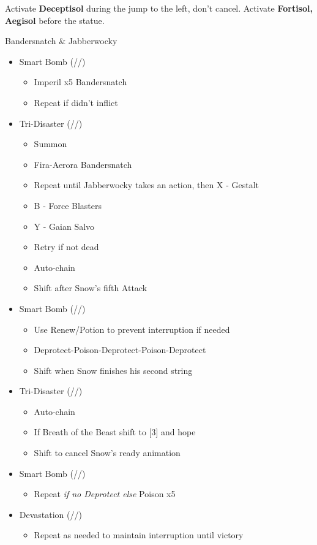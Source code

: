\begin{multicols}{2}
Activate \textbf{Deceptisol} during the jump to the left, don't cancel.
Activate \textbf{Fortisol, Aegisol} before the statue.
\vfill
\renewcommand{\second}{[2] Devastation (\sab/\com/\com)}
\renewcommand{\fifth}{[5] Smart Bomb (\sab/\rav/\rav)}
\renewcommand{\sixth}{[6] Tri-Disaster (\rav/\rav/\rav)}
\begin{battle}{Bandersnatch \& Jabberwocky}
\begin{itemize}
    \item \fifth
    \begin{itemize}
        \item Imperil x5 Bandersnatch
        \item Repeat if didn't inflict
    \end{itemize}
    \item \sixth
    \begin{itemize}
        \item Summon
        \item Fira-Aerora Bandersnatch
        \item Repeat until Jabberwocky takes an action, then X - Gestalt
        \item B - Force Blasters
        \item Y - Gaian Salvo
        \item Retry if not dead
        \item Auto-chain
        \item Shift after Snow's fifth Attack
    \end{itemize}
    \item \fifth
    \begin{itemize}
        \item Use Renew/Potion to prevent interruption if needed
        \item Deprotect-Poison-Deprotect-Poison-Deprotect
        \item Shift when Snow finishes his second string
    \end{itemize}
    \item \sixth
    \begin{itemize}
        \item Auto-chain
        \item If Breath of the Beast shift to [3] and hope
        \item Shift to cancel Snow's ready animation
    \end{itemize}
    \item \fifth
    \begin{itemize}
        \item Repeat \textit{if no Deprotect else } Poison x5
    \end{itemize}
    \item \second
    \begin{itemize}
        \item Repeat as needed to maintain interruption until victory
    \end{itemize}
\end{itemize}
\end{battle}


\end{multicols}
